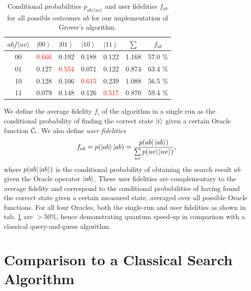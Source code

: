 \begin{table}[H]
\begin{centering}
\begin{tabular}{|c|c|c|c|c|c|c|}
\hline 
$ab$/$|uv\rangle$ & $\left|00\right\rangle $ & $\left|01\right\rangle $ & $\left|10\right\rangle $ & $\left|11\right\rangle $ & $\sum$ & $f_{ab}$\tabularnewline
\hline
\hline 
00 & \textcolor{red}{0.666} & 0.192 & 0.188 & 0.122 & 1.168 & 57.0 \%\tabularnewline
\hline 
01 & 0.127 & \textcolor{red}{0.554} & 0.071 & 0.122 & 0.874 & 63.4 \%\tabularnewline
\hline 
10 & 0.128 & 0.106 & \textcolor{red}{0.615} & 0.239 & 1.088 & 56.5 \%\tabularnewline
\hline 
11 & 0.079 & 0.148 & 0.126 & \textcolor{red}{0.517} & 0.870 & 59.4 \%\tabularnewline
\hline
\end{tabular}
\par\end{centering}

\caption{Conditional probabilities
$p_{ab/|uv\rangle}$ and user fidelities $f_{ab}$ for all
possible outcomes $ab$ for our implementation of Grover's algorithm.}
\label{tab:Probabilities-for-obtaining}
\end{table}

We define the average fidelity $f_i$ of the algorithm in a single run as the conditional probability of finding the correct state $\left| i \right>$ given a certain Oracle function $\Or_i$. We also define {\it user fidelities}
%
\begin{equation}
f_{ab} = p(\left| ab \right>|ab) = \frac{p(ab |\left| ab \right>)}{\sum\limits_{uv}p(uv|\left| uv \right>)},
\end{equation}
%
where $p(ab|\left| ab \right>)$ is the conditional probability of obtaining the search result $ab$ given the Oracle operator $\left| ab \right>$. These user fidelities are complementary to the average fidelity and correspond to the conditional probabilities of having found the correct state given a certain measured state, averaged over all possible Oracle functions. For all four Oracles, both the single-run and user fidelities as shown in tab. \ref{tab:Probabilities-for-obtaining} are $> 50 \%$, hence demonstrating quantum speed-up in comparison with a classical query-and-guess algorithm.

\section{Comparison to a Classical Search Algorithm}

